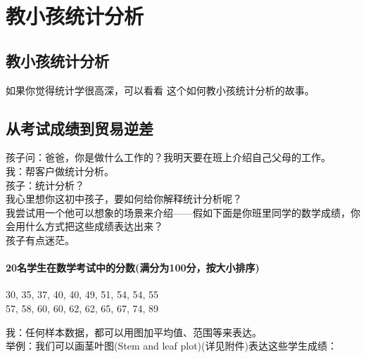 \chapter{教小孩统计分析} %

\hypertarget{ux6559ux5c0fux5b69ux7edfux8ba1ux5206ux6790}{%
\section{教小孩统计分析}\label{ux6559ux5c0fux5b69ux7edfux8ba1ux5206ux6790}}

如果你觉得统计学很高深，可以看看 这个如何教小孩统计分析的故事。

\hypertarget{ux4eceux8003ux8bd5ux6210ux7ee9ux5230ux8d38ux6613ux9006ux5dee}{%
\section{从考试成绩到贸易逆差}\label{ux4eceux8003ux8bd5ux6210ux7ee9ux5230ux8d38ux6613ux9006ux5dee}}

孩子问：爸爸，你是做什么工作的？我明天要在班上介绍自己父母的工作。\\
我：帮客户做统计分析。\\
孩子：统计分析？\\
我心里想你这初中孩子，要如何给你解释统计分析呢？\\
我尝试用一个他可以想象的场景来介绍------假如下面是你班里同学的数学成绩，你会用什么方式把这些成绩表达出来？\\
孩子有点迷茫。\\

\hypertarget{ux4eceux5206ux6790ux5230ux884cux52a8}{%
\subsubsection{20名学生在数学考试中的分数(满分为100分，按大小排序)}\label{ux4eceux5206ux6790ux5230ux884cux52a8}}

30, 35, 37, 40, 40, 49, 51, 54, 54, 55\\
57, 58, 60, 60, 62, 62, 65, 67, 74, 89

我：任何样本数据，都可以用图加平均值、范围等来表达。\\
举例：我们可以画茎叶图(Stem and leaf plot)(详见附件)表达这些学生成绩：\\


